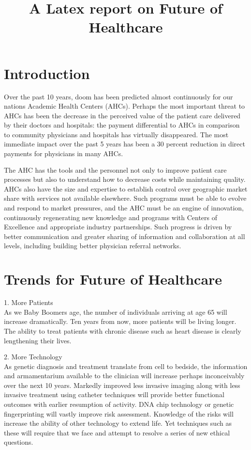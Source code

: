 \documentclass[12pt]{article}
\begin{document}
\title{A Latex report on Future of Healthcare}
\maketitle{}

\section{Introduction}
Over the past 10 years, doom has been predicted almost continuously for our nations Academic Health Centers (AHCs). Perhaps the most important threat to AHCs has been the decrease in the perceived value of the patient care delivered by their doctors and hospitals: the payment differential to AHCs in comparison to community physicians and hospitals has virtually disappeared. The most immediate impact over the past 5 years has been a 30 percent reduction in direct payments for physicians in many AHCs.

The AHC has the tools and the personnel not only to improve patient care processes but also to understand how to decrease costs while maintaining quality. AHCs also have the size and expertise to establish control over geographic market share with services not available elsewhere. Such programs must be able to evolve and respond to market pressures, and the AHC must be an engine of innovation, continuously regenerating new knowledge and programs with Centers of Excellence and appropriate industry partnerships. Such progress is driven by better communication and greater sharing of information and collaboration at all levels, including building better physician referral networks. 
\section{Trends for Future of Healthcare}
1. More Patients\\
As we Baby Boomers age, the number of individuals arriving at age 65 will increase dramatically. Ten years from now, more patients will be living longer. The ability to treat patients with chronic disease such as heart disease is clearly lengthening their lives.

2. More Technology\\
As genetic diagnosis and treatment translate from cell to bedside, the information and armamentarium available to the clinician will increase perhaps inconceivably over the next 10 years. Markedly improved less invasive imaging along with less invasive treatment using catheter techniques will provide better functional outcomes with earlier resumption of activity. DNA chip technology or genetic fingerprinting will vastly improve risk assessment. Knowledge of the risks will increase the ability of other technology to extend life. Yet techniques such as these will require that we face and attempt to resolve a series of new ethical questions.
\end{document}
